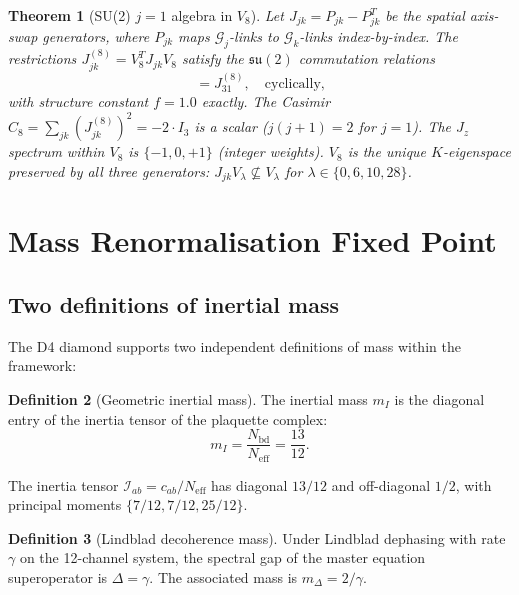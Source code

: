 \documentclass[12pt,a4paper]{article}
\theoremstyle{plain}
\newtheorem{theorem}{Theorem}[section]
\theoremstyle{definition}
\newtheorem{definition}[theorem]{Definition}
\newcommand{\Neff}{N_{\mathrm{eff}}}
\begin{document}
\begin{theorem}[SU(2) $j=1$ algebra in $V_8$]
\label{thm:su2}
  Let $J_{jk} = P_{jk} - P_{jk}^T$ be the spatial axis-swap generators,
  where $P_{jk}$ maps $\mathcal{G}_j$-links to $\mathcal{G}_k$-links
  index-by-index.  The restrictions $J_{jk}^{(8)} = V_8^T J_{jk} V_8$
  satisfy the $\mathfrak{su}(2)$ commutation relations
  \begin{equation}
    [J_{12}^{(8)},\, J_{23}^{(8)}] = J_{31}^{(8)},
    \quad \text{cyclically,}
  \end{equation}
  with structure constant $f = 1.0$ exactly.
  The Casimir $C_8 = \sum_{jk} (J_{jk}^{(8)})^2 = -2 \cdot I_3$
  is a scalar ($j(j+1) = 2$ for $j=1$).
  The $J_z$ spectrum within $V_8$ is $\{-1, 0, +1\}$ (integer weights).
  $V_8$ is the \emph{unique} $K$-eigenspace preserved by all three generators:
  $J_{jk} V_\lambda \not\subseteq V_\lambda$ for $\lambda \in \{0,6,10,28\}$.
\end{theorem}

\section{Mass Renormalisation Fixed Point}
\label{sec:mass}

\subsection{Two definitions of inertial mass}

The D4 diamond supports two independent definitions of mass within the
framework:

\begin{definition}[Geometric inertial mass]
  The inertial mass $m_I$ is the diagonal entry of the inertia tensor of
  the plaquette complex:
  \begin{equation}
    m_I = \frac{N_{\mathrm{bd}}}{N_{\mathrm{eff}}} = \frac{13}{12}.
  \end{equation}
\end{definition}

The inertia tensor $\mathcal{I}_{ab} = c_{ab}/\Neff$ has diagonal
$13/12$ and off-diagonal $1/2$, with principal moments $\{7/12, 7/12, 25/12\}$.

\begin{definition}[Lindblad decoherence mass]
  Under Lindblad dephasing with rate $\gamma$ on the 12-channel system,
  the spectral gap of the master equation superoperator is $\Delta = \gamma$.
  The associated mass is $m_\Delta = 2/\gamma$.
\end{definition}
\end{document}
